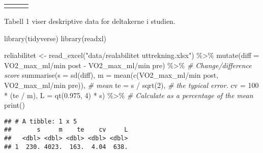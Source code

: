 \documentclass[
]{article}
\newenvironment{Shaded}{\begin{snugshade}}{\end{snugshade}}
\newcommand{\AttributeTok}[1]{\textcolor[rgb]{0.77,0.63,0.00}{#1}}
\newcommand{\CommentTok}[1]{\textcolor[rgb]{0.56,0.35,0.01}{\textit{#1}}}
\newcommand{\DecValTok}[1]{\textcolor[rgb]{0.00,0.00,0.81}{#1}}
\newcommand{\FloatTok}[1]{\textcolor[rgb]{0.00,0.00,0.81}{#1}}
\newcommand{\FunctionTok}[1]{\textcolor[rgb]{0.00,0.00,0.00}{#1}}
\newcommand{\NormalTok}[1]{#1}
\newcommand{\OtherTok}[1]{\textcolor[rgb]{0.56,0.35,0.01}{#1}}
\newcommand{\SpecialCharTok}[1]{\textcolor[rgb]{0.00,0.00,0.00}{#1}}
\newcommand{\StringTok}[1]{\textcolor[rgb]{0.31,0.60,0.02}{#1}}
\begin{document}
\begin{longtable}[c]{|p{1.08in}|p{1.02in}|p{1.02in}}
\noalign{\global\setlength{\arrayrulewidth}{2pt}}\arrayrulecolor[HTML]{666666}\cline{1-3}



\end{longtable}

Tabell 1 viser deskriptive data for deltakerne i studien.

\begin{Shaded}
\begin{Highlighting}[]
\FunctionTok{library}\NormalTok{(tidyverse)}
\FunctionTok{library}\NormalTok{(readxl)}




\NormalTok{reliabilitet }\OtherTok{\textless{}{-}} \FunctionTok{read\_excel}\NormalTok{(}\StringTok{"data/realabilitet uttrekning.xlsx"}\NormalTok{) }\SpecialCharTok{\%\textgreater{}\%}
  \FunctionTok{mutate}\NormalTok{(}\AttributeTok{diff =} \StringTok{\textasciigrave{}}\AttributeTok{VO2\_max\_ml/min post}\StringTok{\textasciigrave{}} \SpecialCharTok{{-}} \StringTok{\textasciigrave{}}\AttributeTok{VO2\_max\_ml/min pre}\StringTok{\textasciigrave{}}\NormalTok{) }\SpecialCharTok{\%\textgreater{}\%} \CommentTok{\# Change/difference score}
  \FunctionTok{summarise}\NormalTok{(}\AttributeTok{s =} \FunctionTok{sd}\NormalTok{(diff),}
            \AttributeTok{m =} \FunctionTok{mean}\NormalTok{(}\FunctionTok{c}\NormalTok{(}\StringTok{\textasciigrave{}}\AttributeTok{VO2\_max\_ml/min post}\StringTok{\textasciigrave{}}\NormalTok{, }\StringTok{\textasciigrave{}}\AttributeTok{VO2\_max\_ml/min pre}\StringTok{\textasciigrave{}}\NormalTok{)), }\CommentTok{\# mean}
            \AttributeTok{te =}\NormalTok{ s }\SpecialCharTok{/} \FunctionTok{sqrt}\NormalTok{(}\DecValTok{2}\NormalTok{), }\CommentTok{\# the typical error. }
            \AttributeTok{cv =} \DecValTok{100} \SpecialCharTok{*}\NormalTok{ (te }\SpecialCharTok{/}\NormalTok{ m),}
             \AttributeTok{L =} \FunctionTok{qt}\NormalTok{(}\FloatTok{0.975}\NormalTok{, }\DecValTok{4}\NormalTok{) }\SpecialCharTok{*}\NormalTok{ s) }\SpecialCharTok{\%\textgreater{}\%} \CommentTok{\# Calculate as a percentage of the mean}
\FunctionTok{print}\NormalTok{()}
\end{Highlighting}
\end{Shaded}

\begin{verbatim}
## # A tibble: 1 x 5
##       s     m    te    cv     L
##   <dbl> <dbl> <dbl> <dbl> <dbl>
## 1  230. 4023.  163.  4.04  638.
\end{verbatim}
\end{document}
